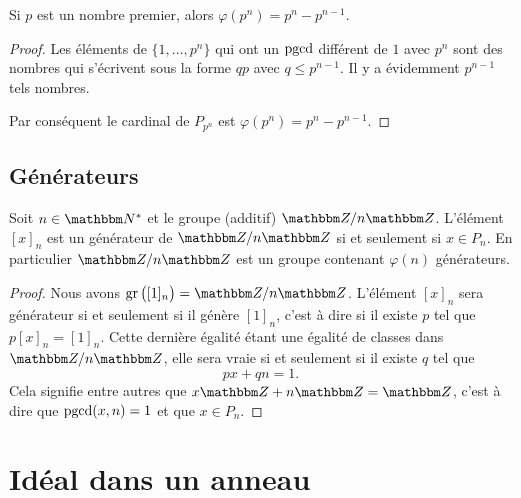 \begin{lemma}
    Si \( p\) est un nombre premier, alors \( \varphi(p^n)=p^n-p^{n-1}\).
\end{lemma}

\begin{proof}
    Les éléments de \( \{ 1,\ldots,p^n \}\) qui ont un \( \operatorname{pgcd}\) différent de \( 1\) avec \( p^n\) sont des nombres qui s'écrivent sous la forme \( qp\) avec \( q\leq p^{n-1}\). Il y a évidemment \( p^{n-1}\) tels nombres.

    Par conséquent le cardinal de \( P_{p^n}\) est \( \varphi(p^{n})=p^n-p^{n-1}\).
\end{proof}

\subsection{Générateurs}

\begin{proposition}     \label{PropZnmuphiGensn}
    Soit \( n\in\eN^*\) et le groupe (additif) \( \eZ/n\eZ\). L'élément \( [x]_n\) est un générateur de \( \eZ/n\eZ\) si et seulement si \( x\in P_n\). En particulier \( \eZ/n\eZ\) est un groupe contenant \( \varphi(n)\) générateurs.
\end{proposition}

\begin{proof}
    Nous avons \( \gr\big( [1]_n \big)=\eZ/n\eZ\). L'élément \( [x]_n\) sera générateur si et seulement si il génère \( [1]_n \), c'est à dire si il existe \( p\) tel que \( p[x]_n=[1]_n\). Cette dernière égalité étant une égalité de classes dans \( \eZ/n\eZ\), elle sera vraie si et seulement si il existe \( q\) tel que
    \begin{equation}
        px+qn=1.
    \end{equation}
    Cela signifie entre autres que \( x\eZ+n\eZ=\eZ\), c'est à dire que \( \operatorname{pgcd}(x,n)=1\) et que \( x\in P_n\).
\end{proof}

\section{Idéal dans un anneau}

